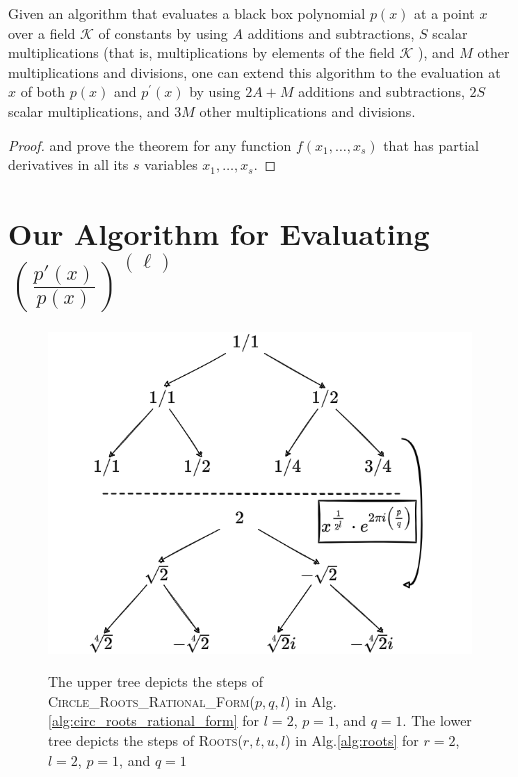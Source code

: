 \documentclass[runningheads]{llncs}
\begin{document}
\begin{theorem}
Given an algorithm that evaluates a black box polynomial $p(x)$ at a point $x$ over a field $\mathcal{K}$ of constants by using $A$ additions and subtractions, $S$ scalar multiplications (that is, multiplications by elements of the field $\mathcal{K}$ ), and $M$ other multiplications and divisions, one can extend this algorithm to the evaluation at $x$ of both $p(x)$ and $p^{\prime}(x)$ by using $2 A+M$ additions and subtractions, $2 S$ scalar multiplications, and $3 M$ other multiplications and divisions.
\end{theorem}

\begin{proof}
\cite{Linnainmaa1976} and \cite{baur1983complexity} prove the theorem for any function $f\left(x_{1}, \ldots, x_{s}\right)$ that has partial derivatives in all its $s$ variables $x_{1}, \ldots, x_{s}$.
\end{proof}






\section{Our Algorithm for Evaluating $\left(\frac{p'(x)}{p(x)}\right)^{(\ell)}$}\label{sec:alg_des}

\begin{figure}[h]
  \centering
  \includegraphics[width=0.8\linewidth]{rational_root_tree.png}
  \caption{The upper tree depicts the steps of \textsc{\textsc{Circle\_Roots\_Rational\_Form}}($p,q,l$) in Alg.\ref{alg:circ_roots_rational_form} for $l=2$, $p=1$, and $q=1$. The lower tree depicts the steps of \textsc{Roots}($r,t,u,l$) in Alg.\ref{alg:roots} for $r=2$, $l=2$, $p=1$, and $q=1$}\label{fig:rat_roots_tree}
  \caption{}
\end{figure}
\end{document}
